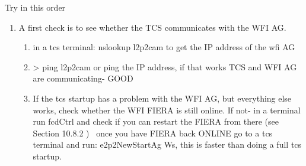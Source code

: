 \documentclass[11pt,fleqn,a4paper]{book}
\begin{document}
\label{proc:fixwfiag}
Try in this order
\begin{enumerate}
	
	\item\label{check}
	A first check is to see whether the TCS communicates with the WFI AG. 
	\begin{enumerate}
		\item in a \gls{tcs} terminal: nslookup l2p2cam to get the IP address of the \gls{wfi} AG
		\item > ping l2p2cam or ping the IP address, if that works TCS and WFI AG are communicating- GOOD
		\item If the \gls{tcs} startup has a problem with the WFI AG, but everything else works, check whether the WFI FIERA is still online. If not- in a terminal run fcdCtrl and check if you can restart the FIERA from there (see Section 10.8.2 )
		\ once you have FIERA back ONLINE go to a \gls{tcs} terminal and run: e2p2NewStartAg Ws, this is faster than doing a full \gls{tcs} startup.\\
	\end{enumerate} 
		

\end{enumerate}
\end{document}

